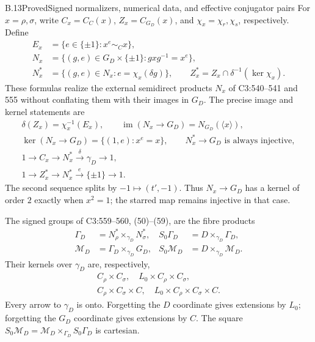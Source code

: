 \begin{statement}{B.13}{Proved}{Signed normalizers, numerical data, and effective conjugator pairs}
For $x=\rho,\sigma$, write $C_x=C_C(x)$, $Z_x=C_{G_D}(x)$,
and $\chi_x=\chi_r,\chi_s$, respectively. Define
\[
\begin{aligned}
 E_x&=\{e\in\{\pm1\}:x^e\sim_C x\},\\
 N_x&=\{(g,e)\in G_D\times\{\pm1\}:gxg^{-1}=x^e\},\\
 N_x^*&=\{(g,e)\in N_x:e=\chi_x(\delta g)\},\qquad
 Z_x^*=Z_x\cap\delta^{-1}(\ker\chi_x).
\end{aligned}
\tag{B.13.5}
\]
These formulas realize the external semidirect products $N_x$ of
C3:540--541 and 555 without conflating them with their images in $G_D$.
The precise image and kernel statements are
\[
\begin{gathered}
 \delta(Z_x)=\chi_x^{-1}(E_x),\qquad
 \operatorname{im}(N_x\to G_D)=N_{G_D}(\langle x\rangle),\\
 \ker(N_x\to G_D)=\{(1,e):x^e=x\},
 \qquad N_x^*\longrightarrow G_D\text{ is always injective},\\
 1\longrightarrow C_x\longrightarrow N_x^*
       \xrightarrow{\delta}\gamma_D\longrightarrow1,\\
 1\longrightarrow Z_x^*\longrightarrow N_x^*
       \xrightarrow{e}\{\pm1\}\longrightarrow1.
\end{gathered}
\tag{B.13.6}
\]
The second sequence splits by $-1\mapsto(t',-1)$.
Thus $N_x\to G_D$ has a kernel of order $2$ exactly when $x^2=1$;
the starred map remains injective in that case.

The signed groups of C3:559--560, (50)--(59), are the fibre products
\[
\begin{aligned}
 \Gamma_D&=N_\rho^*\times_{\gamma_D}N_\sigma^*,&
 S_0\Gamma_D&=D\times_{\gamma_D}\Gamma_D,\\
 \mathcal M_D&=\Gamma_D\times_{\gamma_D}G_D,&
 S_0\mathcal M_D&=D\times_{\gamma_D}\mathcal M_D.
\end{aligned}
\tag{B.13.7}
\]
Their kernels over $\gamma_D$ are, respectively,
\[
\begin{gathered}
 C_\rho\times C_\sigma,\quad
 L_0\times C_\rho\times C_\sigma,\\
 C_\rho\times C_\sigma\times C,\quad
 L_0\times C_\rho\times C_\sigma\times C.
\end{gathered}
\tag{B.13.8}
\]
Every arrow to $\gamma_D$ is onto. Forgetting the $D$ coordinate
gives extensions by $L_0$; forgetting the $G_D$ coordinate gives
extensions by $C$. The square
$S_0\mathcal M_D=\mathcal M_D\times_{\Gamma_D}S_0\Gamma_D$
is cartesian.


\end{statement}
